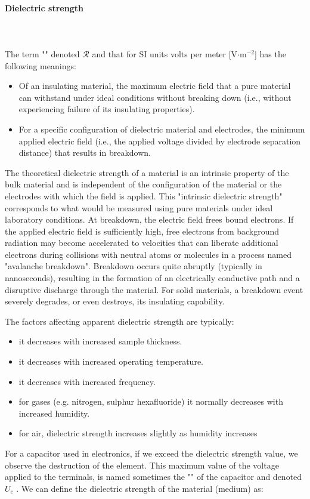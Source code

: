 	\paragraph{Dielectric strength}\mbox{}\\\\
	The term "" denoted $\mathcal{R}$ and that for SI units volts per meter [V$\cdot$m$^{-2}$] has the following meanings:
	\begin{itemize}
		\item Of an insulating material, the maximum electric field that a pure material can withstand under ideal conditions without breaking down (i.e., without experiencing failure of its insulating properties).
		
		\item For a specific configuration of dielectric material and electrodes, the minimum applied electric field (i.e., the applied voltage divided by electrode separation distance) that results in breakdown.
	\end{itemize}
	The theoretical dielectric strength of a material is an intrinsic property of the bulk material and is independent of the configuration of the material or the electrodes with which the field is applied. This "intrinsic dielectric strength" corresponds to what would be measured using pure materials under ideal laboratory conditions. At breakdown, the electric field frees bound electrons. If the applied electric field is sufficiently high, free electrons from background radiation may become accelerated to velocities that can liberate additional electrons during collisions with neutral atoms or molecules in a process named "avalanche breakdown". Breakdown occurs quite abruptly (typically in nanoseconds), resulting in the formation of an electrically conductive path and a disruptive discharge through the material. For solid materials, a breakdown event severely degrades, or even destroys, its insulating capability.

	The factors affecting apparent dielectric strength are typically:
	\begin{itemize}
		\item it decreases with increased sample thickness.
		\item it decreases with increased operating temperature.
		\item it decreases with increased frequency.
		\item for gases (e.g. nitrogen, sulphur hexafluoride) it normally decreases with increased humidity.
		\item for air, dielectric strength increases slightly as humidity increases
	\end{itemize}
	For a capacitor used in electronics, if we exceed the dielectric strength value, we observe the destruction of the element. This maximum value of the voltage applied to the terminals, is named sometimes the "" of the capacitor and denoted $U_c$ . We can define the dielectric strength of the material (medium) as:
	
